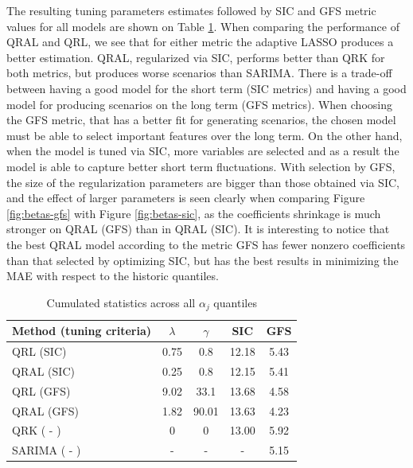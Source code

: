 The resulting tuning parameters estimates followed by SIC and GFS metric values for all models are shown on Table \ref{tab:results-icaraizinho}. When comparing the performance  of QRAL and QRL, we see that for either metric the adaptive LASSO produces a better estimation. 
QRAL, regularized via SIC, performs better than QRK for both metrics, but produces worse scenarios than SARIMA. There is a trade-off between having a good model for the short term (SIC metrics) and having a good model for producing scenarios on the long term (GFS metrics). 
When choosing the GFS metric, that has a better fit for generating scenarios, the chosen model must be able to select important features over the long term. On the other hand, when the model is tuned via SIC, more variables are selected and as a result the model is able to capture better short term fluctuations.
With selection by GFS, the size of the regularization parameters are bigger than those obtained via SIC, and the effect of larger parameters is seen clearly when comparing Figure \ref{fig:betas-gfs} with Figure \ref{fig:betas-sic}, as the coefficients shrinkage is much stronger on QRAL (GFS) than in QRAL (SIC). It is interesting to notice that the best QRAL model according to the metric GFS has fewer nonzero coefficients than that selected by optimizing SIC, but has the best results in minimizing the MAE with respect to the historic quantiles.  
\begin{table}[ht]
	\centering
	\caption{Cumulated statistics across all $\alpha_j$ quantiles}
	\label{tab:results-icaraizinho}
	\begin{tabular}{|l|c|c|c|c|}
		\hline 
		Method (tuning criteria) & $\lambda$ & $\gamma$ & SIC & GFS\tabularnewline
		\hline 
		\hline 
		QRL   (SIC) & 0.75 & 0.8 & 12.18 & 5.43\tabularnewline
		\hline 
		QRAL   (SIC) & 0.25 & 0.8 & 12.15 & 5.41\tabularnewline
		\hline 
		QRL    (GFS) & 9.02 & 33.1 & 13.68 & 4.58\tabularnewline
		\hline 
		QRAL   (GFS) & 1.82 & 90.01 & 13.63 & 4.23\tabularnewline
		\hline 
		QRK    ( - ) & 0 & 0 & 13.00 & 5.92 \tabularnewline
		\hline 
		SARIMA ( - ) & - & - & - & 5.15 \tabularnewline
		\hline 	
	\end{tabular}
	\end{table}
	


